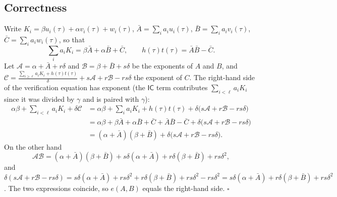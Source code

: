 \documentclass[11pt,a4paper]{report}
\theoremstyle{plain}
\theoremstyle{definition}
\theoremstyle{remark}
\begin{document}
\subsection{Correctness}
Write $K_i=\beta u_i(\tau)+\alpha v_i(\tau)+w_i(\tau)$, $\bar A=\sum_ia_iu_i(\tau)$, $\bar B=\sum_ia_iv_i(\tau)$, $\bar C=\sum_ia_iw_i(\tau)$, so that
\[\sum_ia_iK_i=\beta\bar A+\alpha\bar B+\bar C,\qquad h(\tau)t(\tau)=\bar A\bar B-\bar C.\]
Let $\mathcal A=\alpha+\bar A+r\delta$ and $\mathcal B=\beta+\bar B+s\delta$ be the exponents of $A$ and $B$, and $\mathcal C=\frac{\sum_{i\ge\ell}a_iK_i+h(\tau)t(\tau)}{\delta}+s\mathcal A+r\mathcal B-rs\delta$ the exponent of $C$. The right-hand side of the verification equation has exponent (the $\mathsf{IC}$ term contributes $\sum_{i<\ell}a_iK_i$ since it was divided by $\gamma$ and is paired with $\gamma$):
\begin{align*}
\alpha\beta+\sum_{i<\ell}a_iK_i+\delta\mathcal C
&=\alpha\beta+\sum_ia_iK_i+h(\tau)t(\tau)+\delta\big(s\mathcal A+r\mathcal B-rs\delta\big)\\
&=\alpha\beta+\beta\bar A+\alpha\bar B+\bar C+\bar A\bar B-\bar C+\delta\big(s\mathcal A+r\mathcal B-rs\delta\big)\\
&=(\alpha+\bar A)(\beta+\bar B)+\delta\big(s\mathcal A+r\mathcal B-rs\delta\big).
\end{align*}
On the other hand
\[\mathcal A\mathcal B=(\alpha+\bar A)(\beta+\bar B)+s\delta(\alpha+\bar A)+r\delta(\beta+\bar B)+rs\delta^2,\]
and $\delta(s\mathcal A+r\mathcal B-rs\delta)=s\delta(\alpha+\bar A)+rs\delta^2+r\delta(\beta+\bar B)+rs\delta^2-rs\delta^2=s\delta(\alpha+\bar A)+r\delta(\beta+\bar B)+rs\delta^2$. The two expressions coincide, so $e(A,B)$ equals the right-hand side. \hfill$\square$
\end{document}
